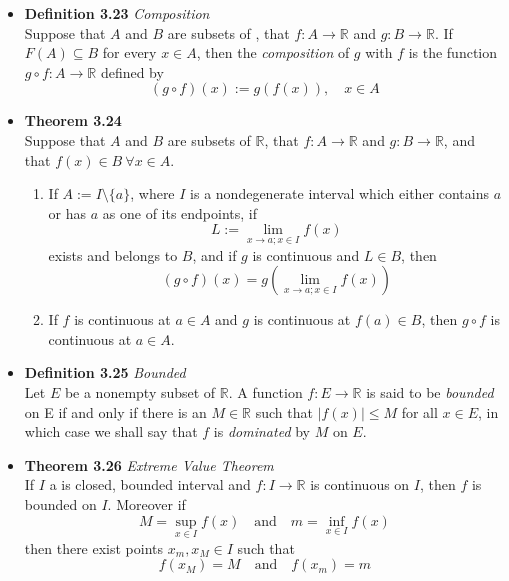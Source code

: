 \documentclass[11pt,a4paper]{article}
\begin{document}
\begin{itemize}
    \item \textbf{Definition 3.23} \emph{Composition} \\
        Suppose that $A$ and $B$ are subsets of , that $f : A \to \mathbb{R}$
        and $g : B \to \mathbb{R}$.
        If $F(A) \subseteq B$ for every $x \in A$, then the \emph{composition} of $g$ with $f$
        is the function $g \circ f : A \to \mathbb{R}$ defined by
        \[
            (g \circ f) (x) := g(f(x)), \quad x \in A
        \]

    \item \textbf{Theorem 3.24} \\
        Suppose that $A$ and $B$ are subsets of $\mathbb{R}$, that $f : A \to \mathbb{R}$
        and $g : B \to \mathbb{R}$, and that $f(x) \in B \ \forall x \in A$.
        \begin{enumerate}
            \item If $A := I \setminus \{a\}$, where $I$ is a nondegenerate interval which
                either contains $a$ or has $a$ as one of its endpoints, if
                \[
                    L := \lim_{x \to a; x \in I} f(x)
                \]
                exists and belongs to $B$, and if $g$ is continuous and $L \in B$, then
                \[
                    (g \circ f) (x) =
                    g \left( \lim_{x \to a; x \in I} f(x)\right)
                \]
            \item If $f$ is continuous at $a \in A$ and $g$ is continuous at $f(a) \in B$,
                then $g \circ f$ is continuous at $a \in A$.
        \end{enumerate}

    \item \textbf{Definition 3.25} \emph{Bounded} \\
        Let $E$ be a nonempty subset of $\mathbb{R}$.
        A function $f : E \to \mathbb{R}$ is said to be \emph{bounded} on E if and only if
        there is an $M \in \mathbb{R}$ such that $|f(x)| \leq M$ for all $x \in E$, in
        which case we shall say that $f$ is \emph{dominated} by $M$ on $E$.

    \item \textbf{Theorem 3.26} \emph{Extreme Value Theorem} \\
        If $I$ a is closed, bounded interval and $f : I \to \mathbb{R}$ is continuous on $I$,
        then $f$ is bounded on $I$.
        Moreover if
        \[
            M = \sup_{x \in I} f(x) \quad \text{and} \quad m = \inf_{x \in I} f(x)
        \]
        then there exist points $x_m, x_M \in I$ such that
        \[
            f(x_M) = M \quad \text{and} \quad f(x_m) = m
        \]



\end{itemize}
\end{document}
